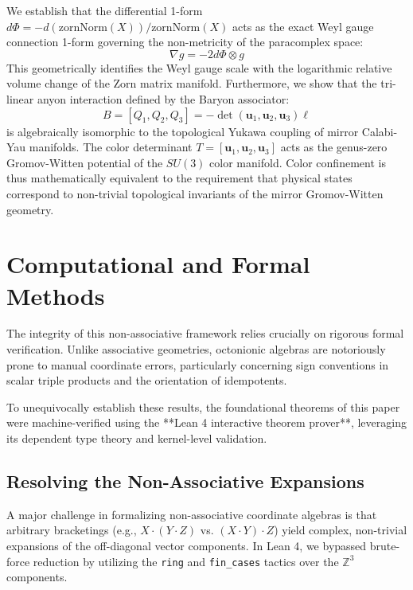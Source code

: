 \documentclass[11pt,a4paper]{article}
\begin{document}
We establish that the differential 1-form $d\Phi = -d(\text{zornNorm}(X))/\text{zornNorm}(X)$ acts as the exact Weyl gauge connection 1-form governing the non-metricity of the paracomplex space:
\begin{equation}
\nabla g = -2 d\Phi \otimes g
\end{equation}
This geometrically identifies the Weyl gauge scale with the logarithmic relative volume change of the Zorn matrix manifold. Furthermore, we show that the tri-linear anyon interaction defined by the Baryon associator:
\begin{equation}
B = [Q_1, Q_2, Q_3] = - \det(\mathbf{u}_1, \mathbf{u}_2, \mathbf{u}_3) \ell
\end{equation}
is algebraically isomorphic to the topological Yukawa coupling of mirror Calabi-Yau manifolds. The color determinant $T = [\mathbf{u}_1, \mathbf{u}_2, \mathbf{u}_3]$ acts as the genus-zero Gromov-Witten potential of the $SU(3)$ color manifold. Color confinement is thus mathematically equivalent to the requirement that physical states correspond to non-trivial topological invariants of the mirror Gromov-Witten geometry.

\section{Computational and Formal Methods}

The integrity of this non-associative framework relies crucially on rigorous formal verification. Unlike associative geometries, octonionic algebras are notoriously prone to manual coordinate errors, particularly concerning sign conventions in scalar triple products and the orientation of idempotents. 

To unequivocally establish these results, the foundational theorems of this paper were machine-verified using the **Lean 4 interactive theorem prover**, leveraging its dependent type theory and kernel-level validation.

\subsection{Resolving the Non-Associative Expansions}
A major challenge in formalizing non-associative coordinate algebras is that arbitrary bracketings (e.g., $X \cdot (Y \cdot Z)$ vs. $(X \cdot Y) \cdot Z$) yield complex, non-trivial expansions of the off-diagonal vector components. In Lean 4, we bypassed brute-force reduction by utilizing the \texttt{ring} and \texttt{fin\_cases} tactics over the $\mathbb{Z}^3$ components.
\end{document}
